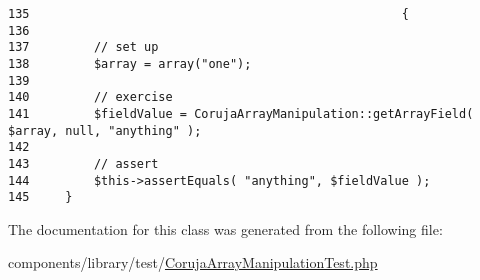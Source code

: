 \begin{Code}\begin{verbatim}135                                                    {
136 
137         // set up
138         $array = array("one");
139 
140         // exercise
141         $fieldValue = CorujaArrayManipulation::getArrayField( $array, null, "anything" );
142 
143         // assert
144         $this->assertEquals( "anything", $fieldValue );
145     }
\end{verbatim}
\end{Code}




The documentation for this class was generated from the following file:\begin{CompactItemize}
\item 
components/library/test/\hyperlink{_coruja_array_manipulation_test_8php}{CorujaArrayManipulationTest.php}\end{CompactItemize}

